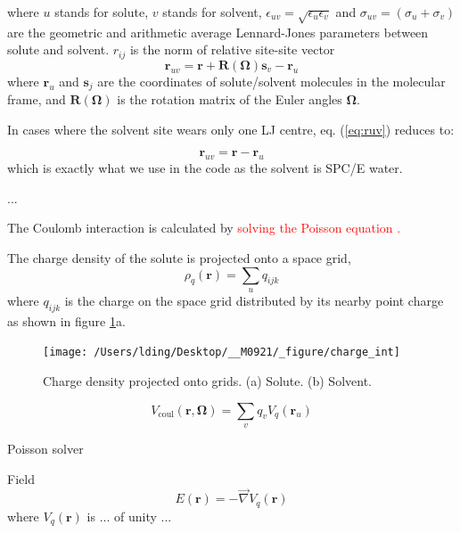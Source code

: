 where $u$ stands for solute,  $v$ stands for solvent, $\epsilon_{uv}=\sqrt{\epsilon_{u}\epsilon_{v}}$
and $\sigma_{uv}=\left(\sigma_{u}+\sigma_{v}\right)$ are the geometric
and arithmetic average Lennard-Jones parameters between solute and
solvent. $r_{ij}$ is the norm of relative site-site vector
\begin{equation}
\mathbf{r}_{uv}=\mathbf{r}+\mathbf{R}(\mathbf{\Omega})\mathbf{s}_{v}-\mathbf{r}_{u}\label{eq:ruv}
\end{equation}
where $\mathbf{r}_{u}$ and $\mathbf{s}_{j}$ are the coordinates
of solute/solvent molecules in the molecular frame, and $\mathbf{R}(\mathbf{\Omega})$ is
the rotation matrix of the Euler angles $\mathbf{\Omega}$.

In cases where the solvent site wears only one LJ centre, eq. (\ref{eq:ruv})
reduces to:

\begin{equation}
\mathbf{r}_{uv}=\mathbf{r}-\mathbf{r}_{u}
\end{equation}
which is exactly what we use in the code as the solvent is SPC/E water.

...

The Coulomb interaction is calculated by \textcolor{red}{solving the
Poisson equation \citep{Marchi_2001}.}

The charge density of the solute is projected onto a space grid,
\begin{equation}
\rho_{q}(\mathbf{r})=\sum_{u}q_{ijk}
\end{equation}
where $q_{ijk}$ is the charge on the space grid distributed by its
nearby point charge as shown in figure \ref{fig:Charge-density-projected}a.

\begin{figure}[h]
\begin{centering}
\texttt{[image: /Users/lding/Desktop/\_\_M0921/\_figure/charge\_int]}
\par\end{centering}

\caption{Charge density projected onto grids\label{fig:Charge-density-projected}.
(a) Solute. (b) Solvent.}
\end{figure}


\begin{equation}
V_{\mathrm{coul}}(\mathbf{r},\mathbf{\Omega})=\sum_{v}q_{v}V_{q}(\mathbf{r}_{u})
\end{equation}


Poisson solver

Field 
\begin{equation}
E(\mathbf{r})=-\overrightarrow{\nabla}V_{q}(\mathbf{r})
\end{equation}
where $V_{q}(\mathbf{r})$ is ... of unity ...

